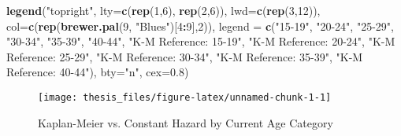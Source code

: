 \documentclass [11pt, proquest] {uwthesis}[2015/03/03]
\newenvironment{Shaded}{}{}
\newcommand{\KeywordTok}[1]{\textcolor[rgb]{0.00,0.44,0.13}{\textbf{{#1}}}}
\newcommand{\DataTypeTok}[1]{\textcolor[rgb]{0.56,0.13,0.00}{{#1}}}
\newcommand{\DecValTok}[1]{\textcolor[rgb]{0.25,0.63,0.44}{{#1}}}
\newcommand{\FloatTok}[1]{\textcolor[rgb]{0.25,0.63,0.44}{{#1}}}
\newcommand{\StringTok}[1]{\textcolor[rgb]{0.25,0.44,0.63}{{#1}}}
\newcommand{\NormalTok}[1]{{#1}}
\newcommand{\OperatorTok}[1]{\textcolor[rgb]{0.00,0.44,0.13}{\textbf{{#1}}}}
\begin{document}
\begin{Shaded}
\begin{Highlighting}[]
\KeywordTok{legend}\NormalTok{(}\StringTok{"topright"}\NormalTok{, }\DataTypeTok{lty=}\KeywordTok{c}\NormalTok{(}\KeywordTok{rep}\NormalTok{(}\DecValTok{1}\NormalTok{,}\DecValTok{6}\NormalTok{), }\KeywordTok{rep}\NormalTok{(}\DecValTok{2}\NormalTok{,}\DecValTok{6}\NormalTok{)), }\DataTypeTok{lwd=}\KeywordTok{c}\NormalTok{(}\KeywordTok{rep}\NormalTok{(}\DecValTok{3}\NormalTok{,}\DecValTok{12}\NormalTok{)), }
       \DataTypeTok{col=}\KeywordTok{c}\NormalTok{(}\KeywordTok{rep}\NormalTok{(}\KeywordTok{brewer.pal}\NormalTok{(}\DecValTok{9}\NormalTok{, }\StringTok{"Blues"}\NormalTok{)[}\DecValTok{4}\OperatorTok{:}\DecValTok{9}\NormalTok{],}\DecValTok{2}\NormalTok{)), }
       \DataTypeTok{legend =} \KeywordTok{c}\NormalTok{(}\StringTok{"15-19"}\NormalTok{, }\StringTok{"20-24"}\NormalTok{, }\StringTok{"25-29"}\NormalTok{, }\StringTok{"30-34"}\NormalTok{, }\StringTok{"35-39"}\NormalTok{, }\StringTok{"40-44"}\NormalTok{,}
                   \StringTok{"K-M Reference: 15-19"}\NormalTok{,}
                   \StringTok{"K-M Reference: 20-24"}\NormalTok{,}
                   \StringTok{"K-M Reference: 25-29"}\NormalTok{,}
                   \StringTok{"K-M Reference: 30-34"}\NormalTok{,}
                   \StringTok{"K-M Reference: 35-39"}\NormalTok{,}
                   \StringTok{"K-M Reference: 40-44"}\NormalTok{), }\DataTypeTok{bty=}\StringTok{"n"}\NormalTok{, }\DataTypeTok{cex=}\FloatTok{0.8}\NormalTok{)}
\end{Highlighting}
\end{Shaded}
\begin{figure}

{\centering \texttt{[image: thesis\_files/figure-latex/unnamed-chunk-1-1]} 

}

\caption{Kaplan-Meier vs. Constant Hazard by Current Age Category}\label{fig:unnamed-chunk-1}
\end{figure}
\end{document}
